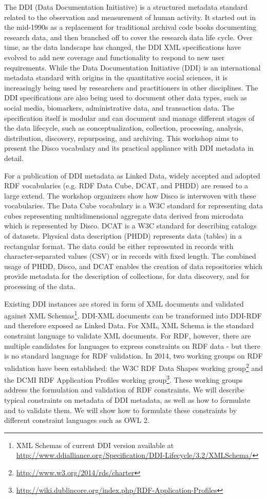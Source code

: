 \documentclass{llncs}
\begin{document}
The DDI (Data Documentation Initiative) is a structured metadata standard related to the observation and measurement of human activity.
It started out in the mid-1990s as a replacement for traditional archival code books documenting research data, and then branched off to cover the research data life cycle. Over time, as the data landscape has
changed, the DDI XML specifications have evolved to add new coverage and functionality to respond to new user requirements.
While the Data Documentation Initiative (DDI) is an international metadata standard with origins in the quantitative social sciences, it is increasingly being used by researchers and practitioners in other disciplines. The DDI specifications are also being used to document other data types, such as social media, biomarkers, administrative data, and transaction data. The specification itself is modular and can document and manage different stages of the data lifecycle, such as conceptualization, collection, processing, analysis, distribution, discovery, repurposing, and archiving.
This workshop aims to present the Disco vocabulary and its practical appliance with DDI metadata in detail.
 
For a publication of DDI metadata as Linked Data, widely accepted and adopted RDF vocabularies (e.g. RDF Data Cube, DCAT, and PHDD) are reused to a large extend. The workshop organizers show how Disco is interwoven with these vocabularies. The Data Cube vocabulary is a W3C standard for representing data cubes representing multidimensional aggregate data derived from microdata which is represented by Disco. DCAT is a W3C standard for describing catalogs of datasets. Physical data description (PHDD) represents data (tables) in a rectangular format. The data could be either represented in records with character-separated values (CSV) or in records with fixed length. The combined usage of PHDD, Disco, and DCAT enables the creation of data repositories which provide metadata for the description of collections, for data discovery, and for processing of the data. 

Existing DDI instances are stored in form of XML documents and validated against XML Schemas\footnote{XML Schemas of current DDI version available at \url{http://www.ddialliance.org/Specification/DDI-Lifecycle/3.2/XMLSchema/}}.
DDI-XML documents can be transformed into DDI-RDF and therefore exposed as Linked Data.
For XML, XML Schema is the standard constraint language to validate XML documents.
For RDF, however, there are multiple candidates for languages to express constraints on RDF data - but there is no standard language for RDF validation.
In 2014, two working groups on RDF validation have been established: the W3C RDF Data Shapes working group\footnote{\url{http://www.w3.org/2014/rds/charter}} and the DCMI RDF Application Profiles working group\footnote{\url{http://wiki.dublincore.org/index.php/RDF-Application-Profiles}}.
These working groups address the formulation and validation of RDF constraints.
We will describe typical constraints on metadata of DDI metadata, as well as how to formulate and to validate them.
We will show how to formulate these constraints by different constraint languages such as OWL 2.
\end{document}
